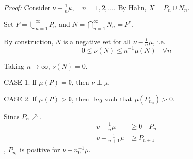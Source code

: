 \documentclass[12pt]{report}
\newcommand{\ep}{\varepsilon}
\newcommand{\M}{\mathcal{M}}
\newenvironment*{tbox}[2][gray]{
    \begin{tcolorbox}[
        parbox=false,
        colback=#1!5!white,
        colframe=#1!75!black,
        breakable,
        title={#2}
    ]}
    {\end{tcolorbox}}
\begin{document}
        \begin{tbox}{\textbf{Lemma (Dichotomy of $\perp$ and $\ll$):} Suppose $\nu$ and $\mu$ are positive, finite measures in $(X, \M)$. Then either 
            \begin{enumerate}
                \item $\mu \perp \nu$
                \item $\exists \ep > 0$, $\exists E \in \M$ which is a positive set for $\nu - \ep \mu$
            \end{enumerate}}
            \emph{Proof:} Consider $\nu - \frac{1}{n}\mu, \quad n = 1, 2, \dots$. By Hahn, $X = P_n \cup N_n$. 

            Set $P = \bigcup_{n=1}^\infty P_n$ and $N = \bigcap_{n=1}^\infty N_n = P^c$.

            By construction, $N$ is a negative set for all $\nu - \frac{1}{n}\mu$, i.e. 
            \[0 \leq \nu(N) \leq n^{-1} \mu(N) \quad \forall n\]

            Taking $n \to \infty$, $\nu(N) = 0$.

            CASE 1. If $\mu(P) = 0$, then $\nu \perp \mu$. 

            CASE 2. If $\mu(P) > 0$, then $\exists n_0$ such that $\mu(P_{n_0}) > 0$.

            Since $P_n \nearrow$, 
            \begin{align*}
                v - \frac{1}{n}\mu &\geq 0 \quad P_n\\ 
                v - \frac{1}{n+1}\mu &\geq P_{n+1}
            \end{align*},
            $P_{n_0}$ is positive for $\nu- n_0^{-1}\mu$.
        \end{tbox}
\end{document}
